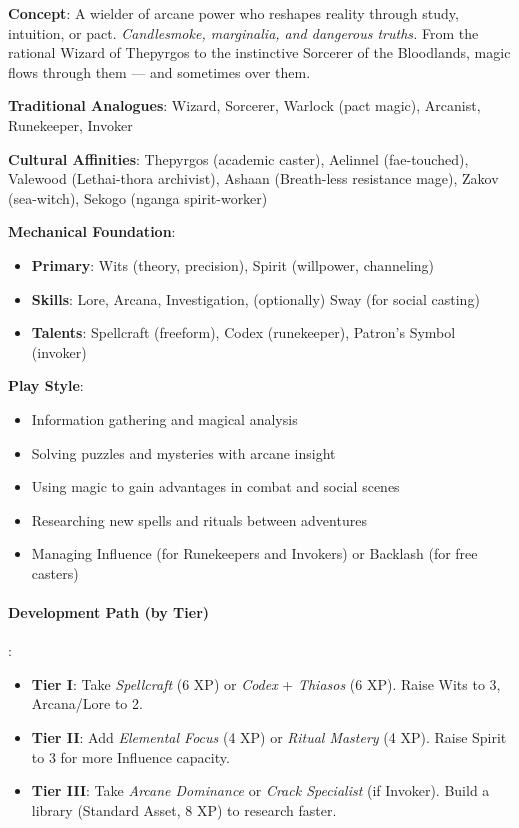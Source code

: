 \textbf{Concept}: A wielder of arcane power who reshapes reality through study, intuition, or pact. \emph{Candlesmoke, marginalia, and dangerous truths.} From the rational Wizard of Thepyrgos to the instinctive Sorcerer of the Bloodlands, magic flows through them --- and sometimes over them.

\textbf{Traditional Analogues}: Wizard, Sorcerer, Warlock (pact magic), Arcanist, Runekeeper, Invoker

\textbf{Cultural Affinities}: Thepyrgos (academic caster), Aelinnel (fae-touched), Valewood (Lethai-thora archivist), Ashaan (Breath-less resistance mage), Zakov (sea-witch), Sekogo (nganga spirit-worker)

\textbf{Mechanical Foundation}:
\begin{itemize}
\item \textbf{Primary}: Wits (theory, precision), Spirit (willpower, channeling)
\item \textbf{Skills}: Lore, Arcana, Investigation, (optionally) Sway (for social casting)
\item \textbf{Talents}: Spellcraft (freeform), Codex (runekeeper), Patron's Symbol (invoker)
\end{itemize}

\textbf{Play Style}:
\begin{itemize}
\item Information gathering and magical analysis
\item Solving puzzles and mysteries with arcane insight
\item Using magic to gain advantages in combat and social scenes
\item Researching new spells and rituals between adventures
\item Managing Influence (for Runekeepers and Invokers) or Backlash (for free casters)
\end{itemize}

\paragraph{Development Path (by Tier)}:
\begin{itemize}
\item \textbf{Tier I}: Take \emph{Spellcraft} (6 XP) or \emph{Codex} + \emph{Thiasos} (6 XP). Raise Wits to 3, Arcana/Lore to 2.
\item \textbf{Tier II}: Add \emph{Elemental Focus} (4 XP) or \emph{Ritual Mastery} (4 XP). Raise Spirit to 3 for more Influence capacity.
\item \textbf{Tier III}: Take \emph{Arcane Dominance} or \emph{Crack Specialist} (if Invoker). Build a library (Standard Asset, 8 XP) to research faster.
\end{itemize}

